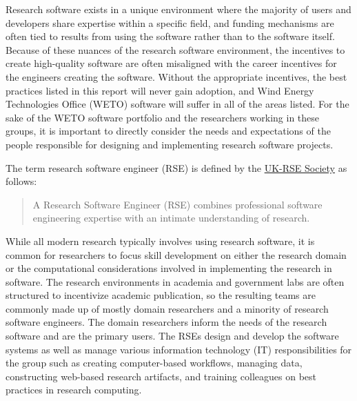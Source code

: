 \documentclass[]{nrel}
\begin{document}
\begin{appendices} %
    

    \label{app:A}

Research software exists in a unique environment where the majority of users and developers
share expertise within a specific field, and funding mechanisms are often tied to results
from using the software rather than to the software itself.
Because of these nuances of the research software environment, the incentives to create high-quality software are often misaligned with the career incentives for the engineers
creating the software.
Without the appropriate incentives, the best practices listed in this report will never gain
adoption, and Wind Energy Technologies Office (WETO) software will suffer in all of the areas listed.
For the sake of the WETO software portfolio and the researchers working in these groups,
it is important to directly consider the needs and expectations of the people
responsible for designing and implementing research software projects.

The term research software engineer (RSE) is defined by the
\href{https://society-rse.org/about/}{UK-RSE Society} as follows:

\begin{quote}
A Research Software Engineer (RSE) combines professional software engineering expertise with
an intimate understanding of research.
\end{quote}

While all modern research typically involves using research software, it is common for researchers
to focus skill development on either the research domain or the computational considerations
involved in implementing the research in software.
The research environments in academia and government labs are often structured to incentivize
academic publication, so the resulting teams are commonly made up of mostly domain researchers
and a minority of research software engineers.
The domain researchers inform the needs of the research software and are the primary users.
The RSEs design and develop the software systems as well as manage various information technology (IT) responsibilities
for the group such as creating computer-based workflows, managing data, constructing web-based
research artifacts, and training colleagues on best practices in research computing.


\end{appendices}
\end{document}
